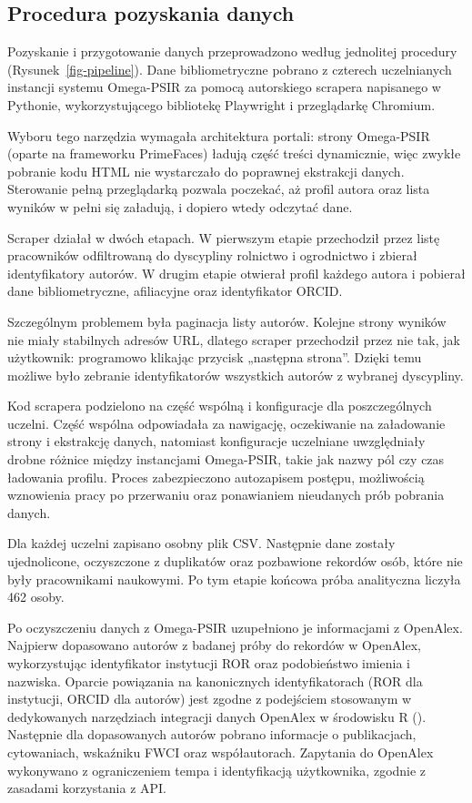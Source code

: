 \documentclass[
  polish,
  12pt,
  a4paper,
]{article}
\begin{document}
\subsection{Procedura pozyskania
danych}\label{procedura-pozyskania-danych}

Pozyskanie i przygotowanie danych przeprowadzono według jednolitej
procedury (Rysunek~\ref{fig-pipeline}). Dane bibliometryczne pobrano z
czterech uczelnianych instancji systemu Omega-PSIR za pomocą autorskiego
scrapera napisanego w Pythonie, wykorzystującego bibliotekę Playwright i
przeglądarkę Chromium.

Wyboru tego narzędzia wymagała architektura portali: strony Omega-PSIR
(oparte na frameworku PrimeFaces) ładują część treści dynamicznie, więc
zwykłe pobranie kodu HTML nie wystarczało do poprawnej ekstrakcji
danych. Sterowanie pełną przeglądarką pozwala poczekać, aż profil autora
oraz lista wyników w pełni się załadują, i dopiero wtedy odczytać dane.

Scraper działał w dwóch etapach. W pierwszym etapie przechodził przez
listę pracowników odfiltrowaną do dyscypliny rolnictwo i ogrodnictwo i
zbierał identyfikatory autorów. W drugim etapie otwierał profil każdego
autora i pobierał dane bibliometryczne, afiliacyjne oraz identyfikator
ORCID.

Szczególnym problemem była paginacja listy autorów. Kolejne strony
wyników nie miały stabilnych adresów URL, dlatego scraper przechodził
przez nie tak, jak użytkownik: programowo klikając przycisk „następna
strona''. Dzięki temu możliwe było zebranie identyfikatorów wszystkich
autorów z wybranej dyscypliny.

Kod scrapera podzielono na część wspólną i konfiguracje dla
poszczególnych uczelni. Część wspólna odpowiadała za nawigację,
oczekiwanie na załadowanie strony i ekstrakcję danych, natomiast
konfiguracje uczelniane uwzględniały drobne różnice między instancjami
Omega-PSIR, takie jak nazwy pól czy czas ładowania profilu. Proces
zabezpieczono autozapisem postępu, możliwością wznowienia pracy po
przerwaniu oraz ponawianiem nieudanych prób pobrania danych.

Dla każdej uczelni zapisano osobny plik CSV. Następnie dane zostały
ujednolicone, oczyszczone z duplikatów oraz pozbawione rekordów osób,
które nie były pracownikami naukowymi. Po tym etapie końcowa próba
analityczna liczyła 462 osoby.

Po oczyszczeniu danych z Omega-PSIR uzupełniono je informacjami z
OpenAlex. Najpierw dopasowano autorów z badanej próby do rekordów w
OpenAlex, wykorzystując identyfikator instytucji ROR oraz podobieństwo
imienia i nazwiska. Oparcie powiązania na kanonicznych identyfikatorach
(ROR dla instytucji, ORCID dla autorów) jest zgodne z podejściem
stosowanym w dedykowanych narzędziach integracji danych OpenAlex w
środowisku R ().
Następnie dla dopasowanych autorów pobrano informacje o publikacjach,
cytowaniach, wskaźniku FWCI oraz współautorach. Zapytania do OpenAlex
wykonywano z ograniczeniem tempa i identyfikacją użytkownika, zgodnie z
zasadami korzystania z API.
\end{document}
